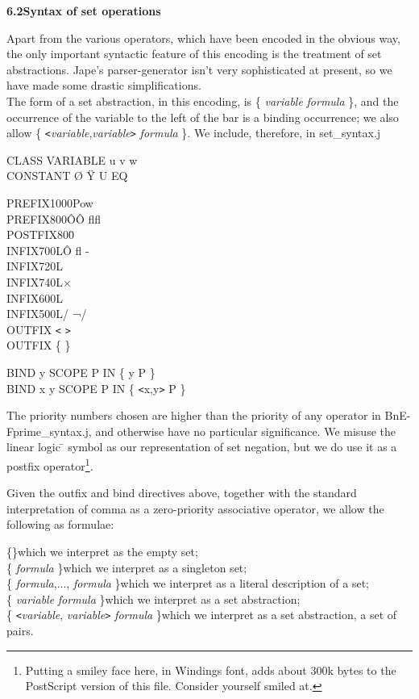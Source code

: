 \documentclass[11pt]{book}
\newcommand{\tab}{\hspace{5mm}}
\begin{document}
\textbf{6.2\tab Syntax of set operations}


Apart from the various operators, which have been encoded in the obvious way, the only important syntactic feature of this encoding is the treatment of set abstractions. Jape's parser-generator isn't very sophisticated at present, so we have made some drastic simplifications.\\
The form of a set abstraction, in this encoding, is \{ \textit{variable} {\textbar} \textit{formula} \}, and the occurrence of the variable to the left of the bar is a binding occurrence; we also allow \{ \texttt{<}\textit{variable},\textit{variable}\texttt{>} {\textbar} \textit{formula} \}. We include, therefore, in set\_syntax.j

CLASS VARIABLE u v w\\
CONSTANT {\O} \"{Y} U EQ

PREFIX\tab 1000\tab Pow\\
PREFIX\tab 800\tab \^{O}\^{O} flfl\\
POSTFIX\tab 800\tab \={}\\
INFIX\tab 700L\tab \^{O} fl -\\
INFIX\tab 720L\tab {\textbullet}\\
INFIX\tab 740L\tab $\times$\\
INFIX\tab 600L\tab {\ss}\\
INFIX\tab 500L\tab / ¬/\\
OUTFIX \texttt{<} \texttt{>}\\
OUTFIX \{ {\textbar} \}

BIND y SCOPE P IN \{ y {\textbar} P \}\\
BIND x y SCOPE P IN \{ \texttt{<}x,y\texttt{>} {\textbar} P \}


The priority numbers chosen are higher than the priority of any operator in BnE-Fprime\_syntax.j, and otherwise have no particular significance. We misuse the linear logic \={} symbol as our representation of set negation, but we do use it as a postfix operator\footnote{Putting a smiley face here, in Windings font, adds about 300k bytes to the PostScript version of this file. Consider yourself smiled at.}.


Given the outfix and bind directives above, together with the standard interpretation of comma as a zero-priority associative operator, we allow the following as formulae:

\{\}\tab which we interpret as the empty set;\\
\{ \textit{formula} \}\tab which we interpret as a singleton set;\\
\{ \textit{formula},..., \textit{formula} \}\tab which we interpret as a literal description of a set;\\
\{ \textit{variable} {\textbar} \textit{formula} \}\tab which we interpret as a set abstraction;\\
\{ \texttt{<}\textit{variable}, \textit{variable}\texttt{>} {\textbar} \textit{formula} \}\tab which we interpret as a set abstraction, a set of pairs.
\end{document}
